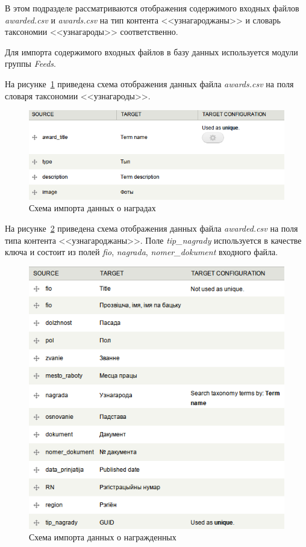 В этом подразделе рассматриваются отображения содержимого входных файлов 
\textit{awarded.csv} и \textit{awards.csv} на тип контента <<узнагароджаны>>
и словарь таксономии <<узнагароды>> соответственно.

Для импорта содержимого входных файлов в базу данных используется модули группы
\textit{Feeds}. 

На рисунке~\ref{fig:awards_map} приведена схема отображения данных файла
\textit{awards.csv} на поля словаря таксономии <<узнагароды>>.

\begin{figure}[h]
  \centering
  \includegraphics[width=150mm]{pic/awards_map.png}
  \caption{Схема импорта данных о наградах}
  \label{fig:awards_map}
\end{figure}

На рисунке~\ref{fig:awarded_map} приведена схема отображения данных файла
\textit{awarded.csv} на поля типа контента <<узнагароджаны>>.
Поле \textit{tip\_nagrady} используется в качестве ключа и состоит из полей
\textit{fio}, \textit{nagrada}, \textit{nomer\_dokument} входного файла.

\begin{figure}[h]
  \centering
  \includegraphics[width=150mm]{pic/awarded_map.png}
  \caption{Схема импорта данных о награжденных}
  \label{fig:awarded_map}
\end{figure}

